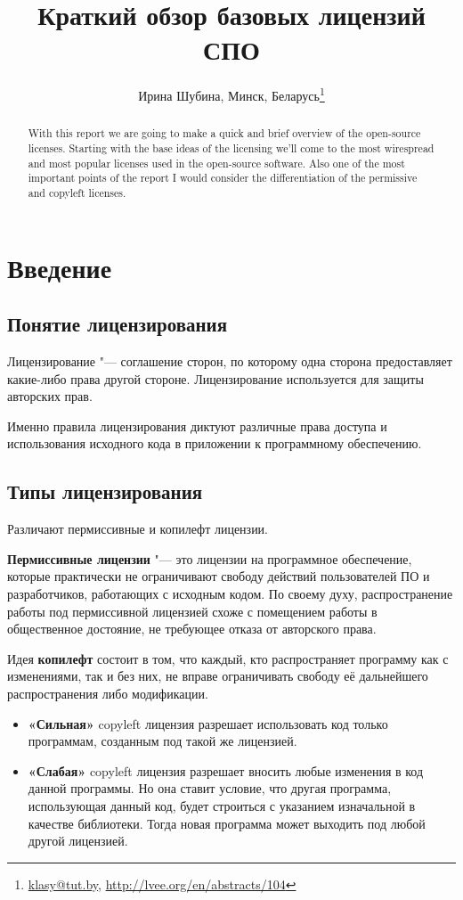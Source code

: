 \documentclass[10pt, a5paper]{article}
\begin{document}
\title{Краткий обзор базовых лицензий СПО}
\author{Ирина Шубина, Минск, Беларусь\footnote{\url{klasy@tut.by}, \url{http://lvee.org/en/abstracts/104}}}
\maketitle
\begin{abstract}
With this report we are going to make a quick and brief overview of the open-source licenses. Starting with the base ideas of the licensing we'll come to the most wirespread and most popular licenses used in the open-source software. Also one of the most important points of the report I would consider the differentiation of the permissive and copyleft licenses.
\end{abstract}
\section*{Введение}

\subsection*{Понятие лицензирования}

Лицензирование "--- соглашение сторон, по которому одна сторона предоставляет какие-либо права другой стороне. Лицензирование используется для защиты авторских прав.

Именно правила лицензирования диктуют различные права доступа и использования исходного кода в приложении к программному обеспечению.

\subsection*{Типы лицензирования}

Различают пермиссивные и копилефт лицензии.

\textbf{Пермиссивные лицензии} "--- это лицензии на программное обеспечение, которые практически не ограничивают свободу действий пользователей ПО и разработчиков, работающих с исходным кодом. По своему духу, распространение работы под пермиссивной лицензией схоже с помещением работы в общественное достояние, не требующее отказа от авторского права.

Идея \textbf{копилефт} состоит в том, что каждый, кто распространяет программу как с изменениями, так и без них, не вправе ограничивать свободу её дальнейшего распространения либо модификации.

\begin{itemize}
  \item \textbf{«Сильная»} copyleft лицензия  разрешает использовать код только программам, созданным под такой же лицензией.
  \item \textbf{«Слабая»} copyleft лицензия разрешает вносить любые изменения в код данной программы. Но она ставит условие, что другая программа, использующая данный код, будет строиться с указанием изначальной в качестве библиотеки. Тогда новая программа может выходить под любой другой лицензией.
\end{itemize}
\end{document}
